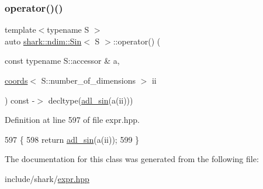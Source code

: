 \subsubsection{\texorpdfstring{operator()()}{operator()()}}
{\footnotesize\ttfamily template$<$typename S $>$ \\
auto \hyperlink{classshark_1_1ndim_1_1_sin}{shark\+::ndim\+::\+Sin}$<$ S $>$\+::operator() (\begin{DoxyParamCaption}\item[{const typename S\+::accessor \&}]{a,  }\item[{\hyperlink{structshark_1_1ndim_1_1coords}{coords}$<$ S\+::number\+\_\+of\+\_\+dimensions $>$}]{ii }\end{DoxyParamCaption}) const -\/$>$ decltype(\hyperlink{namespaceshark_a64eebbcdfd6c5bd1d6358a87dae2a26f}{adl\+\_\+sin}(a(ii))) \hspace{0.3cm}{\ttfamily [inline]}}



Definition at line 597 of file expr.\+hpp.


\begin{DoxyCode}
597                                                                                                            
                        \{
598                 \textcolor{keywordflow}{return} \hyperlink{namespaceshark_a64eebbcdfd6c5bd1d6358a87dae2a26f}{adl\_sin}(a(ii));
599             \}
\end{DoxyCode}


The documentation for this class was generated from the following file\+:\begin{DoxyCompactItemize}
\item 
include/shark/\hyperlink{expr_8hpp}{expr.\+hpp}\end{DoxyCompactItemize}
